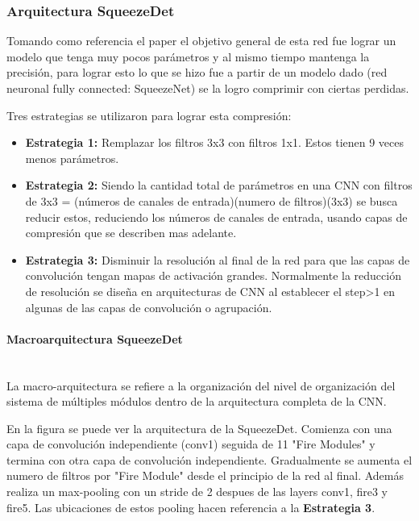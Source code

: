 \subsubsection{Arquitectura SqueezeDet}

Tomando como referencia el paper \cite{SQdet} el objetivo general de esta red fue lograr un modelo que tenga muy pocos parámetros y al mismo tiempo mantenga la precisión, para lograr esto lo que se hizo fue a partir de un modelo dado (red neuronal fully connected: SqueezeNet) se la logro comprimir con ciertas perdidas.\par

Tres estrategias se utilizaron para lograr esta compresión: 
\begin{itemize}
    \item \textbf{Estrategia 1:} Remplazar los filtros 3x3 con filtros 1x1. Estos tienen 9 veces menos parámetros.
    \item \textbf{Estrategia 2:} Siendo la cantidad total de parámetros en una CNN con filtros de 3x3 = (números de canales de entrada)(numero de filtros)(3x3) se busca reducir estos, reduciendo los números de canales de entrada, usando capas de compresión que se describen mas adelante.
    \item \textbf{Estrategia 3:} Disminuir la resolución al final de la red para que las capas de convolución tengan mapas de activación grandes. Normalmente la reducción de resolución se diseña en arquitecturas de CNN al establecer el step>1 en algunas de las capas de convolución o agrupación.
\end{itemize}

\paragraph{Macroarquitectura SqueezeDet}\mbox{}\\

La macro-arquitectura se refiere a la organización del nivel de organización del sistema de múltiples módulos dentro de la arquitectura completa de la CNN.\par

En la figura se puede ver la arquitectura de la SqueezeDet. Comienza con una capa de convolución independiente (conv1) seguida de 11 "Fire Modules" y termina con otra capa de convolución independiente. Gradualmente se aumenta el numero de filtros por "Fire Module" desde el principio de la red al final. Además realiza un max-pooling con un stride de 2 despues de las layers conv1, fire3 y fire5. Las ubicaciones de estos pooling hacen referencia a la \textbf{Estrategia 3}.

